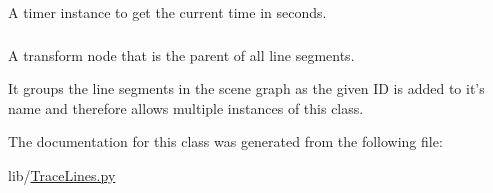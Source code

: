 \-A timer instance to get the current time in seconds. 

\hypertarget{classlib_1_1TraceLines_1_1Trace_ab1358d4b3c99823b5efc88d95c24e788}{
\subsubsection[{transform\-\_\-node}]{}}\label{classlib_1_1TraceLines_1_1Trace_ab1358d4b3c99823b5efc88d95c24e788}


\-A transform node that is the parent of all line segments. 

\-It groups the line segments in the scene graph as the given \-I\-D is added to it's name and therefore allows multiple instances of this class. 

\-The documentation for this class was generated from the following file\-:\begin{DoxyCompactItemize}
\item 
lib/\hyperlink{TraceLines_8py}{\-Trace\-Lines.\-py}\end{DoxyCompactItemize}
